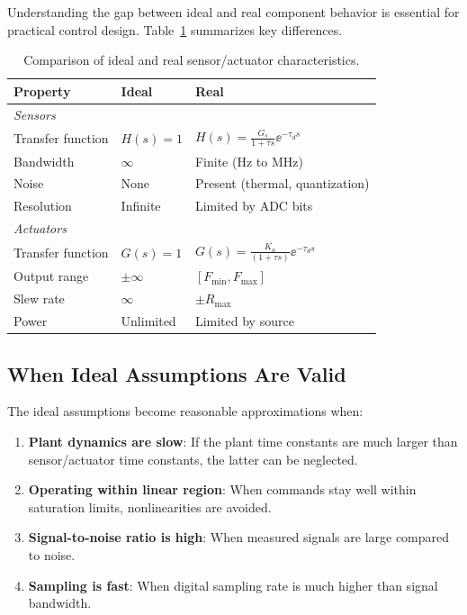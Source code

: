 Understanding the gap between ideal and real component behavior is essential for practical control design. Table~\ref{tab:ideal_vs_real} summarizes key differences.

\begin{table}[htbp]
\centering
\begin{tabular}{lll}
\toprule
\textbf{Property} & \textbf{Ideal} & \textbf{Real} \\
\midrule
\multicolumn{3}{l}{\textit{Sensors}} \\
Transfer function & $H(s) = 1$ & $H(s) = \frac{G_s}{1+\tau s}\ee^{-\tau_d s}$ \\
Bandwidth & $\infty$ & Finite (Hz to MHz) \\
Noise & None & Present (thermal, quantization) \\
Resolution & Infinite & Limited by ADC bits \\
\midrule
\multicolumn{3}{l}{\textit{Actuators}} \\
Transfer function & $G(s) = 1$ & $G(s) = \frac{K_a}{(1+\tau s)}\ee^{-\tau_d s}$ \\
Output range & $\pm\infty$ & $[F_{\min}, F_{\max}]$ \\
Slew rate & $\infty$ & $\pm R_{\max}$ \\
Power & Unlimited & Limited by source \\
\bottomrule
\end{tabular}
\caption{Comparison of ideal and real sensor/actuator characteristics.}
\label{tab:ideal_vs_real}
\end{table}

\subsection{When Ideal Assumptions Are Valid}

The ideal assumptions become reasonable approximations when:
\begin{enumerate}
    \item \textbf{Plant dynamics are slow}: If the plant time constants are much larger than sensor/actuator time constants, the latter can be neglected.
    \item \textbf{Operating within linear region}: When commands stay well within saturation limits, nonlinearities are avoided.
    \item \textbf{Signal-to-noise ratio is high}: When measured signals are large compared to noise.
    \item \textbf{Sampling is fast}: When digital sampling rate is much higher than signal bandwidth.
\end{enumerate}

